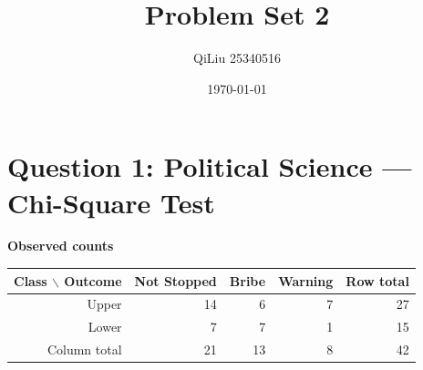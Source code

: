 \documentclass[12pt,letterpaper]{article}
\title{Problem Set 2}
\author{QiLiu 25340516}
\date{\today}
\begin{document}
\maketitle

\section*{Question 1: Political Science --- Chi-Square Test}
\noindent\textbf{Observed counts}
\begin{center}
\begin{tabular}{r|rrr|r}
\hline
Class $\backslash$ Outcome & Not Stopped & Bribe & Warning & Row total\\ \hline
Upper & 14 & 6 & 7 & 27\\
Lower & 7 & 7 & 1 & 15\\ \hline
Column total & 21 & 13 & 8 & 42\\ \hline
\end{tabular}
\end{center}
\end{document}
